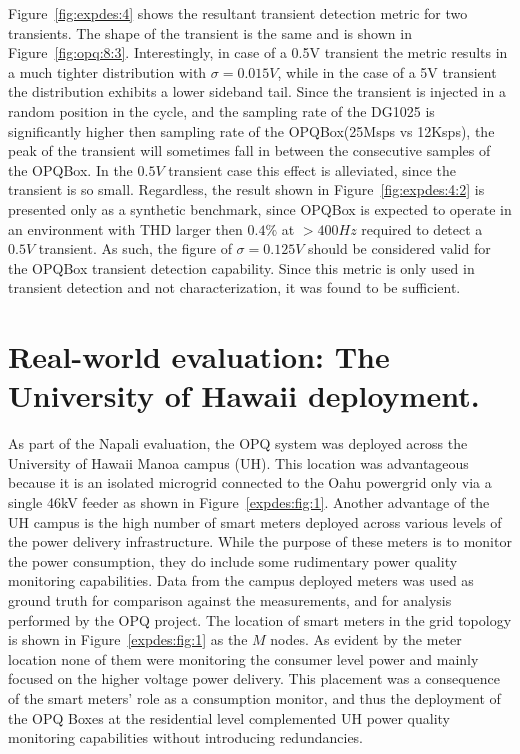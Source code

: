 Figure~\ref{fig:expdes:4} shows the resultant transient detection metric for two transients.
The shape of the transient is the same and is shown in Figure~\ref{fig:opq:8:3}.
Interestingly, in case of a 0.5V transient the metric results in a much tighter distribution with $\sigma =0.015V$, while in the case of
a 5V transient the distribution exhibits a lower sideband tail.
Since the transient is injected in a random position in the cycle, and the sampling rate of the DG1025 is significantly higher then sampling rate of the OPQBox(25Msps vs 12Ksps), the peak of the transient will sometimes fall in between the consecutive samples of the OPQBox.
In the $0.5V$ transient case this effect is alleviated, since the transient is so small.
Regardless, the result shown in Figure~\ref{fig:expdes:4:2} is presented only as a synthetic benchmark, since OPQBox is expected to operate in an environment with THD larger then $0.4\%$ at $>400Hz$ required to detect a $0.5V$ transient.
As such, the figure of $\sigma=0.125V$ should be considered valid for the OPQBox transient detection capability.
Since this metric is only used in transient detection and not characterization, it was found to be sufficient.
\clearpage
\section{Real-world evaluation: The University of Hawaii deployment.}\label{sec:university-of-hawaii-deployment.2}

As part of the Napali evaluation, the OPQ system was deployed across the University of Hawaii Manoa campus (UH).
This location was advantageous because it is an isolated microgrid connected to the Oahu powergrid only via a single 46kV feeder as shown in Figure~\ref{expdes:fig:1}.
Another advantage of the UH campus is the high number of smart meters deployed across various levels of the power delivery infrastructure.
While the purpose of these meters is to monitor the power consumption, they do include some rudimentary power quality monitoring capabilities.
Data from the campus deployed meters was used as ground truth for comparison against the measurements, and for analysis performed by the OPQ project.
The location of smart meters in the grid topology is shown in Figure~\ref{expdes:fig:1} as the $M$ nodes.
As evident by the meter location none of them were monitoring the consumer level power and mainly focused on the higher voltage power delivery.
This placement was a consequence of the smart meters' role as a consumption monitor, and thus the deployment of the OPQ Boxes at the residential level complemented UH power quality monitoring capabilities without introducing redundancies.

